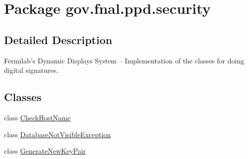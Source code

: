 \hypertarget{namespacegov_1_1fnal_1_1ppd_1_1security}{\section{Package gov.\-fnal.\-ppd.\-security}
\label{namespacegov_1_1fnal_1_1ppd_1_1security}
}


\subsection{Detailed Description}
Fermilab's Dynamic Displays System -- Implementation of the classes for doing digital signatures.\subsection*{Classes}
\begin{DoxyCompactItemize}
\item 
class \hyperlink{classgov_1_1fnal_1_1ppd_1_1security_1_1CheckHostName}{Check\-Host\-Name}
\item 
class \hyperlink{classgov_1_1fnal_1_1ppd_1_1security_1_1DatabaseNotVisibleException}{Database\-Not\-Visible\-Exception}
\item 
class \hyperlink{classgov_1_1fnal_1_1ppd_1_1security_1_1GenerateNewKeyPair}{Generate\-New\-Key\-Pair}
\end{DoxyCompactItemize}
